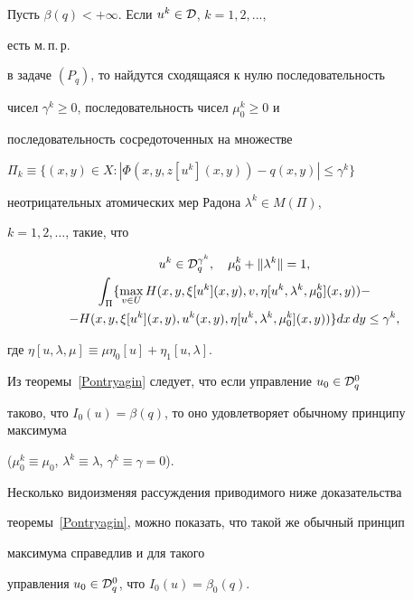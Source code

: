 \begin{thms}


\label{Pontryagin}


Пусть $\beta(q)<+\infty$. Если $u^k\in{\cal D}$, $k=1,2,...$,  %


есть м.\,п.\,р.


в задаче $(P_q)$, то найдутся сходящаяся к нулю последовательность


чисел $\gamma^k\geq 0$, последовательность чисел $\mu^k_0\geq 0$ и


последовательность сосредоточенных на множестве


$\Pi_k\equiv\{(x,y)\in X : |\Phi(x,y,z[u^k](x,y))-q(x,y)|\leq\gamma^k\}$


неотрицательных атомических мер Радона $\lambda^k\in M(\Pi)$,


$k=1,2,\dotsc$, такие, что


\begin{gather}\label{normir}


u^k\in {\cal D}^{\gamma^k}_q,\quad  \mu^k_0+\|\lambda^k\|=1, \\


%


\int_\Pi\{\max_{v\in U}H(x,y,\xi[u^k](x,y), v, \eta[u^k, \lambda^k, 


\mu_0^k](x,y))-\notag \\


%


\label{maxcond}


-H(x,y,\xi[u^k](x,y),u^k(x,y),\eta[u^k,


\lambda^k, \mu_0^k](x,y) )\} dx\,dy\leq\gamma^k,


\end{gather}


где $\eta[u, \lambda, \mu]\equiv\mu\eta_0[u]+\eta_1[u, \lambda]$.


\end{thms}








\begin{notes}


Из теоремы~\ref{Pontryagin} следует, что если управление $u_0\in {\cal D}^0_q$


таково, что $I_0(u)=\beta(q)$, то оно удовлетворяет обычному принципу максимума


($\mu^k_0\equiv\mu_0$, $\lambda^k\equiv\lambda$, $\gamma^k\equiv\gamma=0$). 


Несколько видоизменяя рассуждения приводимого ниже доказательства 


теоремы~\ref{Pontryagin}, можно показать, что такой же обычный принцип 


максимума справедлив и для такого


управления $u_0\in {\cal D}^0_q$, что $I_0(u)=\beta_0(q)$.


\end{notes}








